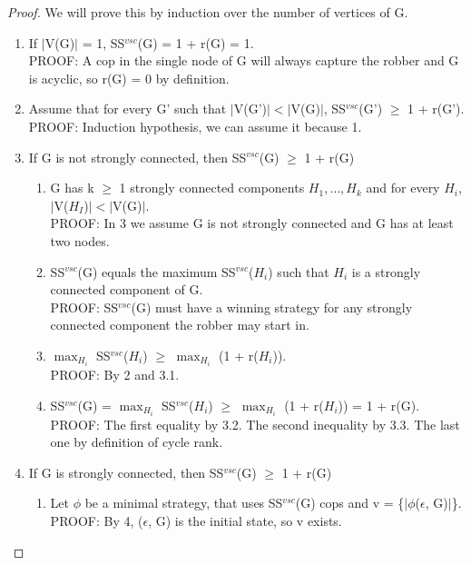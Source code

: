 \begin{proof}
We will prove this by induction over the number of vertices of G.
\begin{enumerate}
  \item If $|$V(G)$|$ = 1, SS$^{vsc}$(G) = 1 + r(G) = 1. \\
  PROOF: A cop in the single node of G will always capture the robber and G is acyclic, so r(G) = 0 by definition.
  \item Assume that for every G' such that  $|$V(G')$| < |$V(G)$|$, SS$^{vsc}$(G') $\geq$ 1 + r(G'). \\
  PROOF: Induction hypothesis, we can assume it because 1.
  \item If G is not strongly connected, then SS$^{vsc}$(G) $\geq$ 1 + r(G)
  \begin{enumerate}[label*=\arabic*.]
    \item G has k $\geq$ 1 strongly connected components $H_1, \ldots, H_k$ and for every $H_i$, $|$V($H_I$)$| < |$V(G)$|$. \\
    PROOF: In 3 we assume G is not strongly connected and G has at least two nodes.
    
    \item SS$^{vsc}$(G) equals the maximum SS$^{vsc}$($H_i$) such that $H_i$ is a strongly connected component of G. \\
    PROOF: SS$^{vsc}$(G) must have a winning strategy for any strongly connected component the robber may start in.
    
    \item $\max_{H_i}$ SS$^{vsc}$($H_i$) $\geq$  $\max_{H_i}$ (1 + r($H_i$)). \\
    PROOF: By 2 and 3.1.
    
    \item SS$^{vsc}$(G) = $\max_{H_i}$ SS$^{vsc}$($H_i$) $\geq$  $\max_{H_i}$ (1 + r($H_i$)) = 1 + r(G). \\
    PROOF: The first equality by 3.2. The second inequality by 3.3. The last one by definition of cycle rank.
  \end{enumerate}
  \item If G is strongly connected, then SS$^{vsc}$(G) $\geq$ 1 + r(G) 
  \begin{enumerate}[label*=\arabic*.]
    \item Let $\phi$ be a minimal strategy, that uses SS$^{vsc}$(G) cops and v = \{$|\phi$($\epsilon$, G)$|$\}. \\
    PROOF: By 4, ($\epsilon$, G) is the initial state, so v exists.
    

\end{enumerate}
\end{enumerate}
\end{proof}
